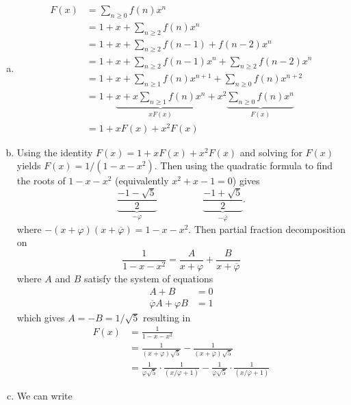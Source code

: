 \documentclass{article}
\newenvironment{solution}[1][Solution.]{\begin{trivlist}
\item[\hskip \labelsep {\bfseries #1}]}{\end{trivlist}}
\begin{document}
\begin{solution} $ $
  \begin{enumerate}[(a)]
    \item \begin{align*}
      F(x) &= \sum_{n\geq0} f(n) x^n \\
      &= 1 + x + \sum_{n\geq2} f(n) x^n \\
      &= 1 + x + \sum_{n\geq2} f(n-1) + f(n-2) x^n \\
      &= 1 + x + \sum_{n\geq2} f(n-1)x^n + \sum_{n\geq2} f(n-2) x^n \\
      &= 1 + x + \sum_{n\geq1} f(n)x^{n+1} + \sum_{n\geq0} f(n) x^{n+2} \\
      &= 1 + \underbrace{x + x\sum_{n\geq1} f(n)x^n}_{xF(x)} + x^2\underbrace{\sum_{n\geq0} f(n) x^n}_{F(x)} \\
      &= 1 + xF(x) + x^2F(x)
    \end{align*}
    \item Using the identity $F(x) = 1 + xF(x) + x^2F(x)$ and solving for $F(x)$
    yields $F(x) = 1/(1 - x - x^2)$. Then using the quadratic formula to
    find the roots of $1 - x - x^2$ (equivalently $x^2 + x - 1 = 0$) gives \[
      \underbrace{\frac{-1 - \sqrt{5}}{2}}_{-\varphi}
      \hspace{1cm}\text{}\hspace{1cm}
      \underbrace{\frac{-1 + \sqrt{5}}{2}}_{-\overline\varphi}.
    \] where $-(x + \varphi)(x + \overline\varphi) = 1 - x - x^2$.
    Then partial fraction decomposition on \[
      \frac{1}{1 - x - x^2}
      = \frac{A}{x + \varphi} + \frac{B}{x + \overline\varphi}
    \] where $A$ and $B$ satisfy the system of equations \begin{align*}
        A + B &= 0 \\
        \overline\varphi A + \varphi B &= 1
    \end{align*} which gives $A = -B = 1/\sqrt 5$ resulting in \begin{align*}
      F(x)
      &= \frac{1}{1 - x - x^2} \\
      &= \frac{1}{(x + \varphi)\sqrt{5}} - \frac{1}{(x+\overline\varphi)\sqrt{5}} \\
      &= \frac{1}{\varphi\sqrt{5}}\cdot\frac{1}{(x/\varphi + 1)}
      - \frac{1}{\overline\varphi\sqrt{5}}\cdot\frac{1}{(x/\overline\varphi + 1)}
    \end{align*}
    \item We can write \begin{align*}

\end{align*}
\end{enumerate}
\end{solution}
\end{document}
